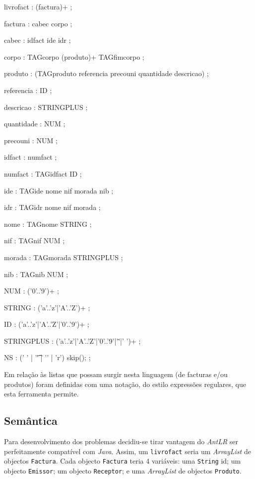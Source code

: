 \documentclass[11pt,a4paper]{article}
\begin{document}
\begin{code_txt}
 
livrofact	:	(factura)+
		;

factura		:	cabec	corpo
		;
	
cabec 		:	idfact 	ide	idr
		;
	
corpo		:	TAGcorpo	(produto)+	TAGfimcorpo
		;	
	
produto 	:	(TAGproduto	referencia 	precouni	quantidade	descricao)
		;	
	
referencia	:	ID
		;	
	
descricao	:	STRINGPLUS
		;	
	
quantidade	:	NUM
		;	
	
precouni	:	NUM
		;	
	
idfact 		:	numfact
		;
	
numfact		:	TAGidfact	ID
		;
	
ide		:	TAGide	nome	nif	morada	nib	
		;
	
idr		:	TAGidr	nome	nif	morada
		;

nome		:	TAGnome	STRING
		;
	
nif		:	TAGnif	NUM
		;

morada		:	TAGmorada	STRINGPLUS
		;

nib		:	TAGnib	NUM
		;

NUM 		:	('0'..'9')+
		;

STRING		:	('a'..'z'|'A'..'Z')+
		;

ID		:	('a'..'z'|'A'..'Z'|'0'..'9')+
		;
	
STRINGPLUS	:	('a'..'z'|'A'..'Z'|'0'..'9'|'\.'|' ')+
		;

NS		:  	(' ' | '\t' | '\n' | 'r') { skip(); }
   		;
\end{code_txt}

Em relação às listas que possam surgir nesta linguagem (de facturas e/ou produtos) foram definidas com uma notação, do estilo expressões regulares,
 que esta ferramenta permite.

\subsection{Semântica}

Para desenvolvimento dos problemas decidiu-se tirar vantagem do \emph{AntLR} ser perfeitamente compatível com \emph{Java}. Assim, um \texttt{livrofact}
 seria um \emph{ArrayList} de objectos \texttt{Factura}. Cada objecto \texttt{Factura} teria 4 variáveis: uma \texttt{String} id; um objecto \texttt{Emissor}; 
um objecto \texttt{Receptor}; e uma \emph{ArrayList} de objectos \texttt{Produto}. \\
\end{document}
